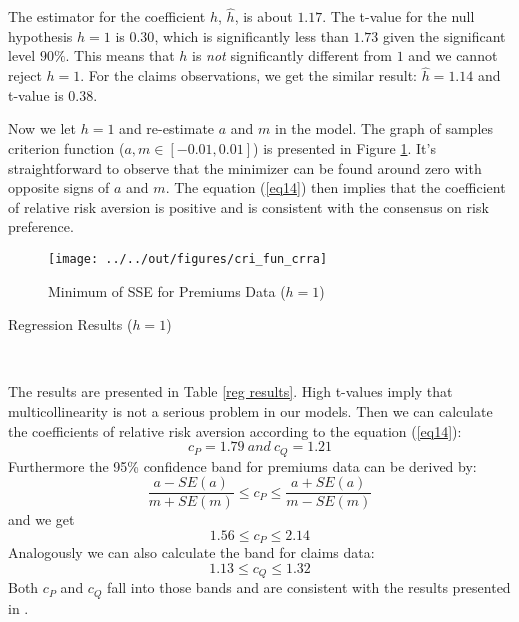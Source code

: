 \documentclass[11pt, a4paper, leqno]{article}
\begin{document}
The estimator for the coefficient $h$, $\hat{h}$, is about $1.17$. The t-value for the null hypothesis $h=1$ is $0.30$, which is significantly less than $1.73$ given the significant level $90\%$. This means that $h$ is \textit{not} significantly different from $1$ and we cannot reject $h=1$. For the claims observations, we get the similar result: $\hat{h}=1.14$ and t-value is $0.38$.

Now we let $h=1$ and re-estimate $a$ and $m$ in the model. The graph of samples criterion function ($a, m \in [-0.01, 0.01]$) is presented in Figure \ref{sse figure}. It's straightforward to observe that the minimizer can be found around zero with opposite signs of $a$ and $m$. The equation (\ref{eq14}) then implies that the coefficient of relative risk aversion is positive and is consistent with the consensus on risk preference.

\begin{figure}[H]
\caption{Minimum of SSE for Premiums Data ($h=1$)}
\texttt{[image: ../../out/figures/cri\_fun\_crra]}\label{sse figure}

\end{figure}

\begin{table}[H]
\renewcommand{\arraystretch}{1.5}
\centering
{}
\caption{Regression Results ($h=1$)}
\\
\label{reg results}
\end{table}

The results are presented in Table \ref{reg results}. High t-values imply that multicollinearity is not a serious problem in our models. Then we can calculate the coefficients of relative risk aversion according to the equation (\ref{eq14}):
$$c_P=1.79\ and\ c_Q=1.21$$
Furthermore the 95\% confidence band for premiums data can be derived by:
$$\frac{a-SE(a)}{m+SE(m)}\le c_P \le \frac{a+SE(a)}{m-SE(m)}$$
and we get 
$$1.56\le c_P \le 2.14$$
Analogously we can also calculate the band for claims data:
$$1.13\le c_Q \le 1.32$$
Both $c_P$ and $c_Q$ fall into those bands and are consistent with the results presented in \citet{szpiro1986measuring}.
\end{document}

